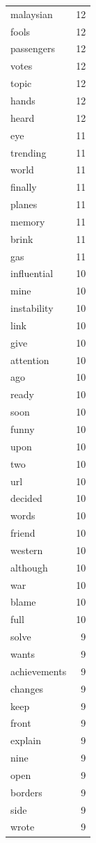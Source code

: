 \begin{tabular}{lr}
malaysian & 12 \\
fools & 12 \\
passengers & 12 \\
votes & 12 \\
topic & 12 \\
hands & 12 \\
heard & 12 \\
eye & 11 \\
trending & 11 \\
world & 11 \\
finally & 11 \\
planes & 11 \\
memory & 11 \\
brink & 11 \\
gas & 11 \\
influential & 10 \\
mine & 10 \\
instability & 10 \\
link & 10 \\
give & 10 \\
attention & 10 \\
ago & 10 \\
ready & 10 \\
soon & 10 \\
funny & 10 \\
upon & 10 \\
two & 10 \\
url & 10 \\
decided & 10 \\
words & 10 \\
friend & 10 \\
western & 10 \\
although & 10 \\
war & 10 \\
blame & 10 \\
full & 10 \\
solve & 9 \\
wants & 9 \\
achievements & 9 \\
changes & 9 \\
keep & 9 \\
front & 9 \\
explain & 9 \\
nine & 9 \\
open & 9 \\
borders & 9 \\
side & 9 \\
wrote & 9 \\

\end{tabular}
